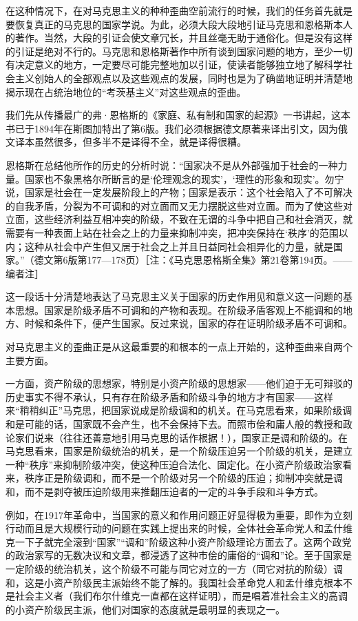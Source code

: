 \documentclass[UTF8, 12pt, a4paper]{ctexrep}
\begin{document}
在这种情况下，在对马克思主义的种种歪曲空前流行的时候，我们的任务首先就是要恢复真正的马克思的国家学说。为此，必须大段大段地引证马克思和恩格斯本人的著作。当然，大段的引证会使文章冗长，并且丝毫无助于通俗化。但是没有这样的引证是绝对不行的。马克思和恩格斯著作中所有谈到国家问题的地方，至少一切有决定意义的地方，一定要尽可能完整地加以引证，使读者能够独立地了解科学社会主义创始人的全部观点以及这些观点的发展，同时也是为了确凿地证明并清楚地揭示现在占统治地位的“考茨基主义”对这些观点的歪曲。

我们先从传播最广的弗·恩格斯的《家庭、私有制和国家的起源》一书讲起，这本书已于1894年在斯图加特出了第6版。我们必须根据德文原著来译出引文，因为俄文译本虽然很多，但多半不是译得不全，就是译得很糟。

恩格斯在总结他所作的历史的分析时说：“国家决不是从外部强加于社会的一种力量。国家也不象黑格尔所断言的是‘伦理观念的现实’，‘理性的形象和现实’。勿宁说，国家是社会在一定发展阶段上的产物；国家是表示：这个社会陷入了不可解决的自我矛盾，分裂为不可调和的对立面而又无力摆脱这些对立面。而为了使这些对立面，这些经济利益互相冲突的阶级，不致在无谓的斗争中把自己和社会消灭，就需要有一种表面上站在社会之上的力量来抑制冲突，把冲突保持在‘秩序’的范围以内；这种从社会中产生但又居于社会之上并且日益同社会相异化的力量，就是国家。”（德文第6版第177—178页）［注：《马克思恩格斯全集》第21卷第194页。——编者注］

这一段话十分清楚地表达了马克思主义关于国家的历史作用见和意义这一问题的基本思想。国家是阶级矛盾不可调和的产物和表现。在阶级矛盾客观上不能调和的地方、时候和条件下，便产生国家。反过来说，国家的存在证明阶级矛盾不可调和。

对马克思主义的歪曲正是从这最重要的和根本的一点上开始的，这种歪曲来自两个主要方面。

一方面，资产阶级的思想家，特别是小资产阶级的思想家——他们迫于无可辩驳的历史事实不得不承认，只有存在阶级矛盾和阶级斗争的地方才有国家——这样来“稍稍纠正”马克思，把国家说成是阶级调和的机关。在马克思看来，如果阶级调和是可能的话，国家既不会产生，也不会保持下去。而照市侩和庸人般的教授和政论家们说来（往往还善意地引用马克思的话作根据！），国家正是调和阶级的。在马克思看来，国家是阶级统治的机关，是一个阶级压迫另一个阶级的机关，是建立一种“秩序”来抑制阶级冲突，使这种压迫合法化、固定化。在小资产阶级政治家看来，秩序正是阶级调和，而不是一个阶级对另一个阶级的压迫；抑制冲突就是调和，而不是剥夺被压迫阶级用来推翻压迫者的一定的斗争手段和斗争方式。

例如，在1917年革命中，当国家的意义和作用问题正好显得极为重要，即作为立刻行动而且是大规模行动的问题在实践上提出来的时候，全体社会革命党人和孟什维克一下子就完全滚到“国家”“调和”阶级这种小资产阶级理论方面去了。这两个政党的政治家写的无数决议和文章，都浸透了这种市侩的庸俗的“调和”论。至于国家是一定阶级的统治机关，这个阶级不可能与同它对立的一方（同它对抗的阶级）调和，这是小资产阶级民主派始终不能了解的。我国社会革命党人和孟什维克根本不是社会主义者（我们布尔什维克一直都在这样证明），而是唱着准社会主义的高调的小资产阶级民主派，他们对国家的态度就是最明显的表现之一。
\end{document}
